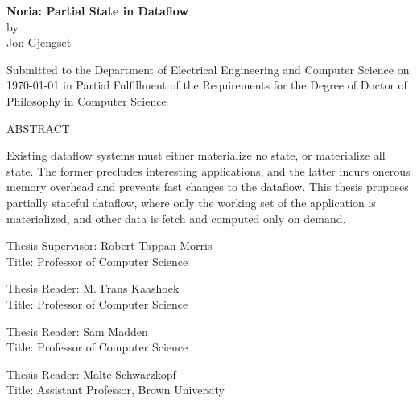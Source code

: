\documentclass[fontsize=12pt,paper=letter]{scrartcl}
\begin{document}
\begin{titlepage}
  \begin{center}
    \textbf{\large Noria: Partial State in Dataflow}\\
    \vspace{0.5\baselineskip}
    by\\
    \vspace{0.5\baselineskip}
    {\large Jon Gjengset}\\
    \vspace{0.5\baselineskip}
    \begin{addmargin}[0.5in]{0.5in}
      \centering
    Submitted to the Department of
    Electrical Engineering and Computer Science
    on \today{}
    in Partial Fulfillment of the Requirements for the Degree of
    Doctor of Philosophy in Computer Science
    \end{addmargin}
  \end{center}
  \vspace{\baselineskip}

  \begin{flushleft}
  ABSTRACT
  \vspace{\baselineskip}

  Existing dataflow systems must either materialize no state, or materialize
  all state. The former precludes interesting applications, and the latter
  incurs onerous memory overhead and prevents fast changes to the dataflow.
  This thesis proposes partially stateful dataflow, where only the working set
  of the application is materialized, and other data is fetch and computed
  only on demand.

  \vspace{\baselineskip}
  Thesis Supervisor: Robert Tappan Morris\\
  Title: Professor of Computer Science

  \vspace{\baselineskip}
  Thesis Reader: M. Frans Kaashoek\\
  Title: Professor of Computer Science

  \vspace{\baselineskip}
  Thesis Reader: Sam Madden\\
  Title: Professor of Computer Science

  \vspace{\baselineskip}
  Thesis Reader: Malte Schwarzkopf\\
  Title: Assistant Professor, Brown University
  \end{flushleft}
\end{titlepage}
\end{document}
